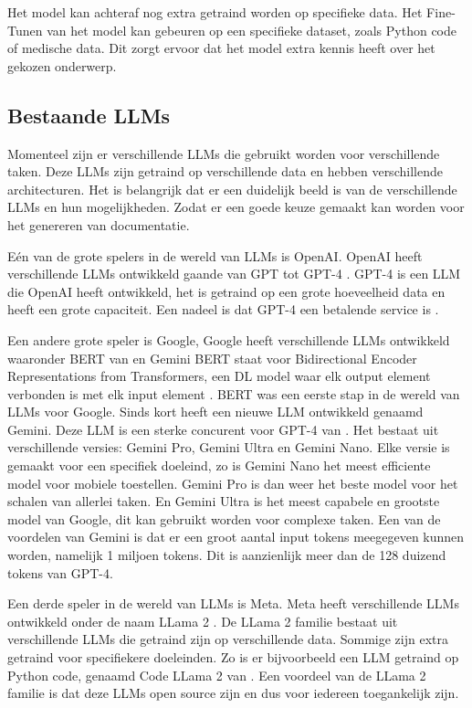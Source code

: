 Het model kan achteraf nog extra getraind worden op specifieke data. 
Het Fine-Tunen van het model kan gebeuren op een specifieke dataset, zoals Python code of medische data.
Dit zorgt ervoor dat het model extra kennis heeft over het gekozen onderwerp.

\subsection{Bestaande LLMs}
\label{sec:bestaande-llms}

Momenteel zijn er verschillende LLMs die gebruikt worden voor verschillende taken.
Deze LLMs zijn getraind op verschillende data en hebben verschillende architecturen.
Het is belangrijk dat er een duidelijk beeld is van de verschillende LLMs en hun mogelijkheden. 
Zodat er een goede keuze gemaakt kan worden voor het genereren van documentatie.

Eén van de grote spelers in de wereld van LLMs is OpenAI. OpenAI heeft verschillende LLMs ontwikkeld gaande van GPT \autocite{RandfordEtAL2018} tot GPT-4 \autocite{OpenAI2023}.
GPT-4 is een LLM die OpenAI heeft ontwikkeld, het is getraind op een grote hoeveelheid data en heeft een grote capaciteit.
Een nadeel is dat GPT-4 een betalende service is \autocite{OpenAI2023}.

Een andere grote speler is Google, Google heeft verschillende LLMs ontwikkeld waaronder BERT van \textcite{DevlinEtAl2019} en Gemini \autocite{Google2024}
BERT staat voor Bidirectional Encoder Representations from Transformers, een DL model waar elk output element verbonden is met elk input element \autocite{HashemiPour2024}.
BERT was een eerste stap in de wereld van LLMs voor Google. Sinds kort heeft \textcite{Google2024} een nieuwe LLM ontwikkeld genaamd Gemini.
Deze LLM is een sterke concurent voor GPT-4 van \textcite{OpenAI2023}. Het bestaat uit verschillende versies: Gemini Pro, Gemini Ultra en Gemini Nano. 
Elke versie is gemaakt voor een specifiek doeleind, zo is Gemini Nano het meest efficiente model voor mobiele toestellen. Gemini Pro is dan weer het beste model voor het schalen van allerlei taken.
En Gemini Ultra is het meest capabele en grootste model van Google, dit kan gebruikt worden voor complexe taken.
Een van de voordelen van Gemini is dat er een groot aantal input tokens meegegeven kunnen worden, namelijk 1 miljoen tokens.
Dit is aanzienlijk meer dan de 128 duizend tokens van GPT-4.

Een derde speler in de wereld van LLMs is Meta. Meta heeft verschillende LLMs ontwikkeld onder de naam LLama 2 \autocite{Meta2024}.
De LLama 2 familie bestaat uit verschillende LLMs die getraind zijn op verschillende data. Sommige zijn extra getraind voor specifiekere doeleinden.
Zo is er bijvoorbeeld een LLM getraind op Python code, genaamd Code LLama 2 van \textcite{Roziere2024}.
Een voordeel van de LLama 2 familie is dat deze LLMs open source zijn en dus voor iedereen toegankelijk zijn.

